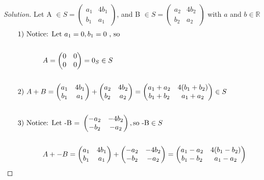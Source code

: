 \documentclass[12pt]{article}
\begin{document}
\begin{proof}[Solution]
\noindent Let A $\in S = 
	\begin{pmatrix}
		a_1 & 4b_1 \\
		b_1 & a_1
	\end{pmatrix}$, and B $\in S = 
	\begin{pmatrix}
		a_2 & 4b_2 \\
		b_2 & a_2
	\end{pmatrix}$ with $a$ and $b \in \mathbb{R}$
\\
	\begin{align*}
		&\text{1) Notice: Let $a_1 = 0, b_1 = 0$ , so } 
		\\ \\
		&\indent \qquad A =
		\begin{pmatrix}
		0 & 0 \\
		0 & 0
		\end{pmatrix} = 0_S \in S
		 \\ \\
		&\text{2) }A + B = 
		\begin{pmatrix}
		a_1 & 4b_1 \\
		b_1 & a_1
		\end{pmatrix} + 
		\begin{pmatrix}
		a_2 & 4b_2 \\
		b_2 & a_2
		\end{pmatrix} = 
		\begin{pmatrix}
		a_1 + a_2 & 4(b_1 + b_2) \\
		b_1 + b_2 & a_1 + a_2
		\end{pmatrix} 
		\in S
		\\ \\
		&\text{3) Notice: Let -B = }
		\begin{pmatrix}
			-a_2 & -4b_2 \\
			-b_2 & -a_2
		\end{pmatrix}, \text{so -B} \in S
		\\ \\
		&\indent \qquad A + -B = 
		\begin{pmatrix}
			a_1 & 4b_1 \\
			b_1 & a_1
		\end{pmatrix} + 
		\begin{pmatrix}
			-a_2 & -4b_2 \\
			-b_2 & -a_2
		\end{pmatrix}
		= \begin{pmatrix}
			a_1 - a_2 & 4(b_1 - b_2) \\
			b_1 - b_2 & a_1 - a_2

\end{pmatrix}
\end{align*}
\end{proof}
\end{document}
